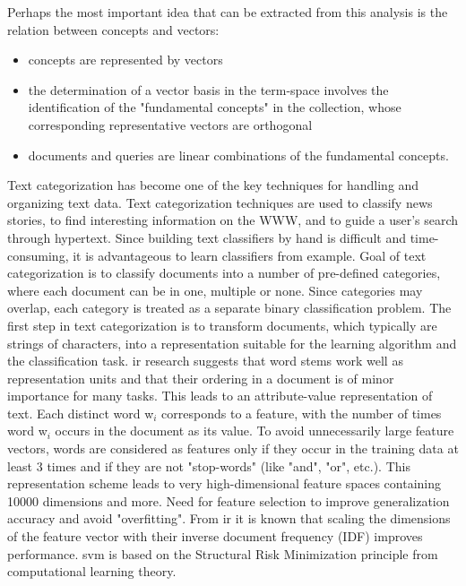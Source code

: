 Perhaps the most important idea that can be extracted from this analysis is the relation between concepts and vectors: 
\begin{itemize}
	\item concepts are represented by vectors
	\item the determination of a vector basis in the term-space involves the identification of the "fundamental concepts" in the collection, 
	whose corresponding representative vectors are orthogonal
	\item documents and queries are linear combinations of the fundamental concepts.
\end{itemize}
\cite{Kaestner2013}




Text categorization has become one of the key techniques for handling and organizing text data. 
Text categorization techniques are used to classify news stories, to find interesting information on the WWW, and to guide a user's search through hypertext. 
Since building text classifiers by hand is difficult and time-consuming, it is advantageous to learn classifiers from example.  
Goal of text categorization is to classify documents into a number of pre-defined categories, where each document can be in one, multiple or none. 
Since categories may overlap, each category is treated as a separate binary classification problem.
The first step in text categorization is to transform documents, which typically are strings of characters, into a representation suitable for the learning algorithm and the classification task.
\gls{ir} research suggests that word stems work well as representation units and that their ordering in a document is of minor importance for many tasks. 
This leads to an attribute-value representation of text. 
Each distinct word w$_{i}$ corresponds to a feature, with the number of times word w$_{i}$ occurs in the document as its value. 
To avoid unnecessarily large feature vectors, words are considered as features only if they occur in the training data at least 3 times and if they are not "stop-words" (like "and", "or", etc.).
This representation scheme leads to very high-dimensional feature spaces containing 10000 dimensions and more. 
Need for feature selection to improve generalization accuracy and avoid "overfitting". 
From \gls{ir} it is known that scaling the dimensions of the feature vector with their inverse document frequency (IDF) improves performance.
\gls{svm} is based on the Structural Risk Minimization principle from computational learning theory. 
